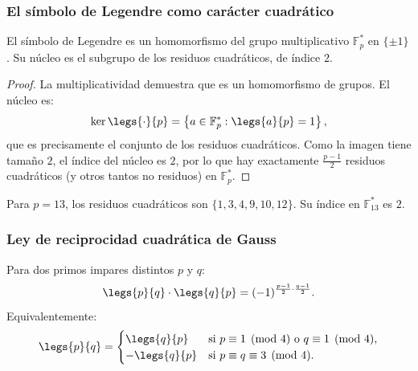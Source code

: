 \subsubsection{El símbolo de Legendre como carácter cuadrático}

\begin{proposicion}
El símbolo de Legendre es un homomorfismo del grupo multiplicativo $\mathbb{F}_p^*$ en $\{\pm 1\}$. Su núcleo es el subgrupo de los residuos cuadráticos, de índice $2$.
\end{proposicion}

\begin{proof}
La multiplicatividad demuestra que es un homomorfismo de grupos. El núcleo es:
\[
\ker\legs{\cdot}{p} = \left\{ a \in \mathbb{F}_p^* : \legs{a}{p} = 1 \right\},
\]
que es precisamente el conjunto de los residuos cuadráticos. Como la imagen tiene tamaño $2$, el índice del núcleo es $2$, por lo que hay exactamente $\frac{p-1}{2}$ residuos cuadráticos (y otros tantos no residuos) en $\mathbb{F}_p^*$.
\end{proof}

\begin{ejemplo}
Para $p = 13$, los residuos cuadráticos son $\{1, 3, 4, 9, 10, 12\}$. Su índice en $\mathbb{F}_{13}^*$ es $2$.
\end{ejemplo}

\subsubsection{Ley de reciprocidad cuadrática de Gauss}

\begin{teorema}
Para dos primos impares distintos $p$ y $q$:
\[
\legs{p}{q} \cdot \legs{q}{p} = (-1)^{\frac{p-1}{2} \cdot \frac{q-1}{2}}.
\]
Equivalentemente:
\[
\legs{p}{q} =
\begin{cases}
\legs{q}{p} & \text{si } p \equiv 1 \pmod{4} \text{ o } q \equiv 1 \pmod{4}, \\
-\legs{q}{p} & \text{si } p \equiv q \equiv 3 \pmod{4}.
\end{cases}
\]
\end{teorema}


